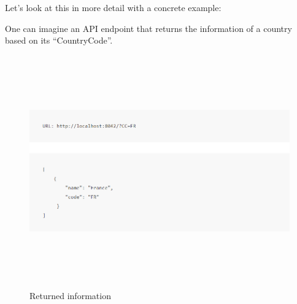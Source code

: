 \begin{itemize}
\begin{itemize}
        Let’s look at this in more detail with a concrete example:
        
        One can imagine an API endpoint that returns the information of a country based on its “CountryCode”.\\
        \begin{figure}[!h]
         \centering
         \includegraphics[width=\linewidth, height=10cm,keepaspectratio]{figures/ex1.PNG}
         \caption{Returned information}
        \end{figure}


\end{itemize}
\end{itemize}
